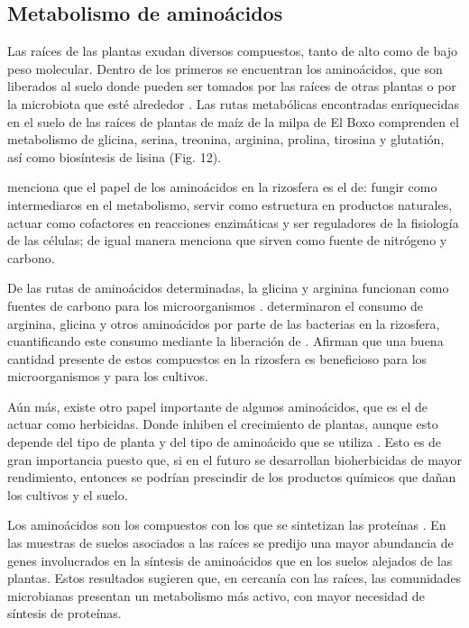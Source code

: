 \documentclass[12pt,letterpaper,oneside]{report}
\begin{document}
\subsection{Metabolismo de aminoácidos}
Las raíces de las plantas exudan diversos compuestos, tanto de alto como de bajo peso molecular. Dentro de los primeros se encuentran los aminoácidos, que son liberados al suelo donde pueden ser tomados por las raíces de otras plantas o por la microbiota que esté alrededor \autocite{Badri2009}. Las rutas metabólicas encontradas enriquecidas en el suelo de las raíces de plantas de maíz de la milpa de El Boxo comprenden el metabolismo de glicina, serina, treonina, arginina, prolina, tirosina y glutatión, así como biosíntesis de lisina (Fig. 12).
\par
\textcite{Moe2013} menciona que el papel de los aminoácidos en la rizosfera es el de: fungir como intermediaros en el metabolismo, servir como estructura en productos naturales, actuar como cofactores en reacciones enzimáticas y ser reguladores de la fisiología de las células; de igual manera menciona que sirven como fuente de nitrógeno y carbono.
\par
De las rutas de aminoácidos determinadas, la glicina y arginina funcionan como fuentes de carbono para los microorganismos \autocite{Pizer1965}. \textcite{Haney2018} determinaron el consumo de arginina, glicina y otros aminoácidos por parte de las bacterias en la rizosfera, cuantificando este consumo mediante la liberación de . Afirman que una buena cantidad presente de estos compuestos en la rizosfera es beneficioso para los microorganismos y para los cultivos.
\par
Aún más, existe otro papel importante de algunos aminoácidos, que es el de actuar como herbicidas. Donde inhiben el crecimiento de plantas, aunque esto depende del tipo de planta y del tipo de aminoácido que se utiliza \autocite{Fernandez-Aparicio2017}. Esto es de gran importancia puesto que, si en el futuro se desarrollan bioherbicidas de mayor rendimiento, entonces se podrían prescindir de los productos químicos que dañan los cultivos y el suelo.
\par
Los aminoácidos son los compuestos con los que se sintetizan las proteínas \autocite{Ambrogelly2006}. En las muestras de suelos asociados a las raíces se predijo una mayor abundancia de genes involucrados en la síntesis de aminoácidos que en los suelos alejados de las plantas. Estos resultados sugieren que, en cercanía con las raíces, las comunidades microbianas presentan un metabolismo más activo, con mayor necesidad de síntesis de proteínas.
\end{document}
